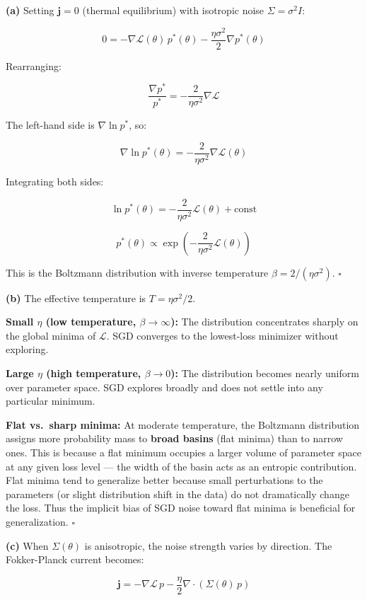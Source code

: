 \documentclass[
]{article}
\begin{document}
\textbf{(a)} Setting \(\mathbf{j} = 0\) (thermal equilibrium) with
isotropic noise \(\Sigma = \sigma^2 I\):

\[0 = -\nabla\mathcal{L}(\theta)\,p^*(\theta) - \frac{\eta\sigma^2}{2}\nabla p^*(\theta)\]

Rearranging:

\[\frac{\nabla p^*}{p^*} = -\frac{2}{\eta\sigma^2}\nabla\mathcal{L}\]

The left-hand side is \(\nabla\ln p^*\), so:

\[\nabla\ln p^*(\theta) = -\frac{2}{\eta\sigma^2}\nabla\mathcal{L}(\theta)\]

Integrating both sides:

\[\ln p^*(\theta) = -\frac{2}{\eta\sigma^2}\mathcal{L}(\theta) + \text{const}\]

\[\boxed{p^*(\theta) \propto \exp\!\left(-\frac{2}{\eta\sigma^2}\mathcal{L}(\theta)\right)}\]

This is the Boltzmann distribution with inverse temperature
\(\beta = 2/(\eta\sigma^2)\). \(\square\)

\textbf{(b)} The effective temperature is \(T = \eta\sigma^2/2\).

\textbf{Small \(\eta\) (low temperature, \(\beta \to \infty\)):} The
distribution concentrates sharply on the global minima of
\(\mathcal{L}\). SGD converges to the lowest-loss minimizer without
exploring.

\textbf{Large \(\eta\) (high temperature, \(\beta \to 0\)):} The
distribution becomes nearly uniform over parameter space. SGD explores
broadly and does not settle into any particular minimum.

\textbf{Flat vs.~sharp minima:} At moderate temperature, the Boltzmann
distribution assigns more probability mass to \textbf{broad basins}
(flat minima) than to narrow ones. This is because a flat minimum
occupies a larger volume of parameter space at any given loss level ---
the width of the basin acts as an entropic contribution. Flat minima
tend to generalize better because small perturbations to the parameters
(or slight distribution shift in the data) do not dramatically change
the loss. Thus the implicit bias of SGD noise toward flat minima is
beneficial for generalization. \(\square\)

\textbf{(c)} When \(\Sigma(\theta)\) is anisotropic, the noise strength
varies by direction. The Fokker-Planck current becomes:

\[\mathbf{j} = -\nabla\mathcal{L}\,p - \frac{\eta}{2}\nabla\cdot(\Sigma(\theta)\,p)\]
\end{document}

